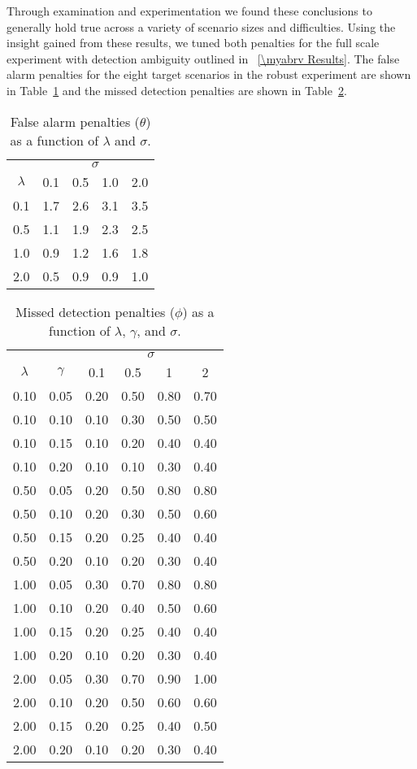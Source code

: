 Through examination and experimentation we found these conclusions to generally hold true across a variety of scenario sizes and difficulties. Using the insight gained from these results, we tuned both penalties for the full scale experiment with detection ambiguity outlined in \mysection~\ref{\myabrv Results}. The false alarm penalties for the eight target scenarios in the robust experiment are shown in Table~\ref{tab:Theta_Penalties} and the missed detection penalties are shown in Table~\ref{tab:Phi_Penalties}.
\begin{table}[ht]
\centering
\begin{tabular}{c|m{1cm}m{1cm}m{1cm}m{1cm}}
  \hline
   & \multicolumn{4}{c}{$\sigma$} \\
   \cline{2-5}
   $\lambda$ & 0.1 & 0.5 & 1.0 & 2.0\\
  \hline
  \hline
   0.1 & 1.7 & 2.6 & 3.1 & 3.5 \\
   0.5 & 1.1 & 1.9 & 2.3 & 2.5 \\ 
   1.0 & 0.9 & 1.2 & 1.6 & 1.8 \\ 
   2.0 & 0.5 & 0.9 & 0.9 & 1.0 \\ 
   \hline
\end{tabular}
\caption{False alarm penalties ($\theta$) as a function of $\lambda$ and $\sigma$.}
\label{tab:Theta_Penalties}
\end{table}
\begin{table}[ht]
\centering
\begin{tabular}{cc|cccc}
  \hline
  & & \multicolumn{4}{c}{$\sigma$} \\
  \cline{3-6}
 $\lambda$ & $\gamma$ & 0.1 & 0.5 & 1 & 2 \\ 
  \hline
  \hline
   0.10 & 0.05 & 0.20 & 0.50 & 0.80 & 0.70 \\ 
   0.10 & 0.10 & 0.10 & 0.30 & 0.50 & 0.50 \\ 
   0.10 & 0.15 & 0.10 & 0.20 & 0.40 & 0.40 \\ 
   0.10 & 0.20 & 0.10 & 0.10 & 0.30 & 0.40 \\ 
   0.50 & 0.05 & 0.20 & 0.50 & 0.80 & 0.80 \\ 
   0.50 & 0.10 & 0.20 & 0.30 & 0.50 & 0.60 \\ 
   0.50 & 0.15 & 0.20 & 0.25 & 0.40 & 0.40 \\ 
   0.50 & 0.20 & 0.10 & 0.20 & 0.30 & 0.40 \\ 
   1.00 & 0.05 & 0.30 & 0.70 & 0.80 & 0.80 \\ 
   1.00 & 0.10 & 0.20 & 0.40 & 0.50 & 0.60 \\ 
   1.00 & 0.15 & 0.20 & 0.25 & 0.40 & 0.40 \\ 
   1.00 & 0.20 & 0.10 & 0.20 & 0.30 & 0.40 \\ 
   2.00 & 0.05 & 0.30 & 0.70 & 0.90 & 1.00 \\ 
   2.00 & 0.10 & 0.20 & 0.50 & 0.60 & 0.60 \\ 
   2.00 & 0.15 & 0.20 & 0.25 & 0.40 & 0.50 \\ 
   2.00 & 0.20 & 0.10 & 0.20 & 0.30 & 0.40 \\ 
   \hline
\end{tabular}
\caption{Missed detection penalties ($\phi$) as a function of $\lambda$, $\gamma$, and $\sigma$.}
\label{tab:Phi_Penalties}
\end{table}